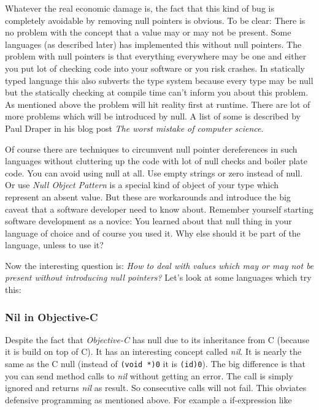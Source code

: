 \documentclass[11pt, a4paper]{report}
\begin{document}
Whatever the real economic damage is, the fact that this kind of bug is completely avoidable by removing null pointers is obvious. To be clear: There is no problem with the concept that a value may or may not be present. Some languages (as described later) has implemented this without null pointers. The problem with null pointers is that everything everywhere may be one and either you put lot of checking code into your software or you risk crashes. In statically typed language this also subverts the type system because every type may be null but the statically checking at compile time can't inform you about this problem. As mentioned above the problem will hit reality first at runtime. There are lot of more problems which will be introduced by null. A list of some is described by Paul Draper in his blog post \textit{The worst mistake of computer science}\cite{draper-worst-mistake-cs}.

Of course there are techniques to circumvent null pointer dereferences in such languages without cluttering up the code with lot of null checks and boiler plate code. You can avoid using null at all. Use empty strings or zero instead of null. Or use \textit{Null Object Pattern} is a special kind of object of your type which represent an absent value. But these are workarounds and introduce the big caveat that a software developer need to know about. Remember yourself starting software development as a novice: You learned about that null thing in your language of choice and of course you used it. Why else should it be part of the language, unless to use it?

Now the interesting question is: \textit{How to deal with values which may or may not be present without introducing null pointers?} Let's look at some languages which try this:

\subsubsection{Nil in Objective-C}
Despite the fact that \textit{Objective-C} has null due to its inheritance from C (because it is build on top of C). It has an interesting concept called \textit{nil}. It is nearly the same as the C null (instead of \texttt{(void *)0} it is \texttt{(id)0}). The big difference is that you can send method calls to \textit{nil} without getting an error. The call is simply ignored and returns \textit{nil} as result. So consecutive calls will not fail. This obviates defensive programming as mentioned above. For example a if-expression like
\end{document}
